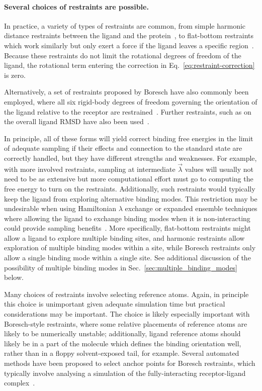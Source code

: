 \documentclass[9pt,bestpractices,pubversion]{livecoms}
\begin{document}
\paragraph{Several choices of restraints are possible.}
In practice, a variety of types of restraints are common, from simple harmonic distance restraints between the ligand and the protein~\cite{mobley2006use}, to flat-bottom restraints which work similarly but only exert a force if the ligand leaves a specific region~\cite{chen2007can}.
Because these restraints do not limit the rotational degrees of freedom of the ligand, the rotational term entering the correction in Eq.~\ref{eq:restraint-correction} is zero.

Alternatively, a set of restraints proposed by Boresch have also commonly been employed, where all six rigid-body degrees of freedom governing the orientation of the ligand relative to the receptor are restrained~\cite{boresch2003absolute, leitgeb2005alchemical}.
Further restraints, such as on the overall ligand RMSD have also been used~\cite{woo2005calculation}.

In principle, all of these forms will yield correct binding free energies in the limit of adequate sampling if their effects and connection to the standard state are correctly handled, but they have different strengths and weaknesses.
For example, with more involved restraints, sampling at intermediate $\vec{\lambda}$ values will usually not need to be as extensive but more computational effort must go to computing the free energy to turn on the restraints.
Additionally, such restraints would typically keep the ligand from exploring alternative binding modes. This  restriction may be undesirable when using Hamiltonian $\lambda$ exchange or expanded ensemble techniques where allowing the ligand to exchange binding modes when it is non-interacting could provide sampling benefits~\cite{wang2013identifying}.
More specifically, flat-bottom restraints might allow a ligand to explore multiple binding sites, and harmonic restraints allow exploration of multiple binding modes within a site, while Boresch restraints only allow a single binding mode within a single site.
See additional discussion of the possibility of multiple binding modes in Sec.~\ref{sec:multiple_binding_modes} below.

Many choices of restraints involve selecting reference atoms.
Again, in principle this choice is unimportant given adequate simulation time but practical considerations may be important.
The choice is likely especially important with Boresch-style restraints, where some relative placements of reference atoms are likely to be numerically unstable; additionally, ligand reference atoms should likely be in a part of the molecule which defines the binding orientation well, rather than in a floppy solvent-exposed tail, for example. Several automated methods have been proposed to select anchor points for Boresch restraints, which typically involve analysing a simulation of the fully-interacting receptor-ligand complex~\cite{alibay2022evaluating, alibay2021mdrestraintsgenerator, baumann2023broadening, chen2023enhancing, hedges2023suite}.
\end{document}
